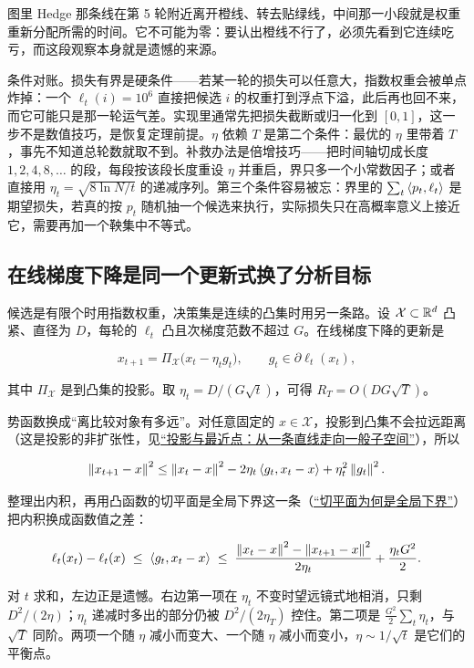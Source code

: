 图里 Hedge 那条线在第 5 轮附近离开橙线、转去贴绿线，中间那一小段就是权重重新分配所需的时间。它不可能为零：要认出橙线不行了，必须先看到它连续吃亏，而这段观察本身就是遗憾的来源。

条件对账。损失有界是硬条件——若某一轮的损失可以任意大，指数权重会被单点炸掉：一个 \(\ell_t(i)=10^{6}\) 直接把候选 \(i\) 的权重打到浮点下溢，此后再也回不来，而它可能只是那一轮运气差。实现里通常先把损失截断或归一化到 \([0,1]\)，这一步不是数值技巧，是恢复定理前提。\(\eta\) 依赖 \(T\) 是第二个条件：最优的 \(\eta\) 里带着 \(T\)，事先不知道总轮数就取不到。补救办法是倍增技巧——把时间轴切成长度 \(1,2,4,8,\dots\) 的段，每段按该段长度重设 \(\eta\) 并重启，界只多一个小常数因子；或者直接用 \(\eta_t=\sqrt{8\ln N/t}\) 的递减序列。第三个条件容易被忘：界里的 \(\sum_t\left\langle p_t,\ell_t\right\rangle\) 是期望损失，若真的按 \(p_t\) 随机抽一个候选来执行，实际损失只在高概率意义上接近它，需要再加一个鞅集中不等式。

\subsection{在线梯度下降是同一个更新式换了分析目标}

候选是有限个时用指数权重，决策集是连续的凸集时用另一条路。设 \(\mathcal X\subset\mathbb{R}^d\) 凸紧、直径为 \(D\)，每轮的 \(\ell_t\) 凸且次梯度范数不超过 \(G\)。在线梯度下降的更新是

\[
x_{t+1}=\Pi_{\mathcal X}\bigl(x_t-\eta_t g_t\bigr),\qquad g_t\in\partial\ell_t(x_t),
\]

其中 \(\Pi_{\mathcal X}\) 是到凸集的投影。取 \(\eta_t=D/(G\sqrt t)\)，可得 \(R_T=O(DG\sqrt T)\)。

势函数换成``离比较对象有多远''。对任意固定的 \(x\in\mathcal X\)，投影到凸集不会拉远距离（这是投影的非扩张性，见\hyperref[sec:03-Linear-Algebra/03-Orthogonality/02]{``投影与最近点：从一条直线走向一般子空间''}），所以

\[
\left\lVert x_{t+1}-x\right\rVert^2\le\left\lVert x_t-x\right\rVert^2-2\eta_t\left\langle g_t,x_t-x\right\rangle+\eta_t^2\left\lVert g_t\right\rVert^2 .
\]

整理出内积，再用凸函数的切平面是全局下界这一条（\hyperref[sec:09-Convex-Optimization/03-Convex-Functions/02]{``切平面为何是全局下界''}）把内积换成函数值之差：

\[
\ell_t(x_t)-\ell_t(x)\;\le\;\left\langle g_t,x_t-x\right\rangle\;\le\;\frac{\left\lVert x_t-x\right\rVert^2-\left\lVert x_{t+1}-x\right\rVert^2}{2\eta_t}+\frac{\eta_t G^2}{2}.
\]

对 \(t\) 求和，左边正是遗憾。右边第一项在 \(\eta_t\) 不变时望远镜式地相消，只剩 \(D^2/(2\eta)\)；\(\eta_t\) 递减时多出的部分仍被 \(D^2/(2\eta_T)\) 控住。第二项是 \(\frac{G^2}{2}\sum_t\eta_t\)，与 \(\sqrt T\) 同阶。两项一个随 \(\eta\) 减小而变大、一个随 \(\eta\) 减小而变小，\(\eta\sim1/\sqrt t\) 是它们的平衡点。

